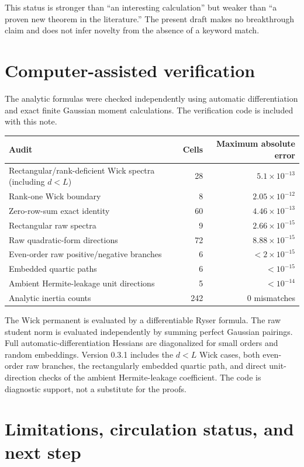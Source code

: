\documentclass[11pt]{article}
\begin{document}
This status is stronger than ``an interesting calculation'' but weaker than ``a proven new theorem in the literature.''  The present draft makes no breakthrough claim and does not infer novelty from the absence of a keyword match.

\section{Computer-assisted verification}

The analytic formulas were checked independently using automatic differentiation and exact finite Gaussian moment calculations.  The verification code is included with this note.

\begin{center}
\begin{tabular}{@{}lrr@{}}
\toprule
Audit & Cells & Maximum absolute error\\
\midrule
Rectangular/rank-deficient Wick spectra (including $d<L$) & 28 & $5.1\times10^{-13}$\\
Rank-one Wick boundary & 8 & $2.05\times10^{-12}$\\
Zero-row-sum exact identity & 60 & $4.46\times10^{-13}$\\
Rectangular raw spectra & 9 & $2.66\times10^{-15}$\\
Raw quadratic-form directions & 72 & $8.88\times10^{-15}$\\
Even-order raw positive/negative branches & 6 & $<2\times10^{-15}$\\
Embedded quartic paths & 6 & $<10^{-15}$\\
Ambient Hermite-leakage unit directions & 5 & $<10^{-14}$\\
Analytic inertia counts & 242 & $0$ mismatches\\
\bottomrule
\end{tabular}
\end{center}

The Wick permanent is evaluated by a differentiable Ryser formula.  The raw student norm is evaluated independently by summing perfect Gaussian pairings.  Full automatic-differentiation Hessians are diagonalized for small orders and random embeddings.  Version 0.3.1 includes the $d<L$ Wick cases, both even-order raw branches, the rectangularly embedded quartic path, and direct unit-direction checks of the ambient Hermite-leakage coefficient.  The code is diagnostic support, not a substitute for the proofs.

\section{Limitations, circulation status, and next step}
\end{document}
